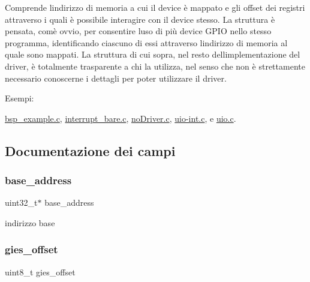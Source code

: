 Comprende l\textquotesingle{}indirizzo di memoria a cui il device è mappato e gli offset dei registri attraverso i quali è possibile interagire con il device stesso. La struttura è pensata, com\textquotesingle{}è ovvio, per consentire l\textquotesingle{}uso di più device G\+P\+IO nello stesso programma, identificando ciascuno di essi attraverso l\textquotesingle{}indirizzo di memoria al quale sono mappati. La struttura di cui sopra, nel resto dell\textquotesingle{}implementazione del driver, è totalmente trasparente a chi la utilizza, nel senso che non è strettamente necessario conoscerne i dettagli per poter utilizzare il driver. \begin{Desc}
\item[Esempi\+: ]\par
\hyperlink{bsp_example_8c-example}{bsp\+\_\+example.\+c}, \hyperlink{interrupt_bare_8c-example}{interrupt\+\_\+bare.\+c}, \hyperlink{no_driver_8c-example}{no\+Driver.\+c}, \hyperlink{uio-int_8c-example}{uio-\/int.\+c}, e \hyperlink{uio_8c-example}{uio.\+c}.\end{Desc}


\subsection{Documentazione dei campi}
\mbox{\label{structmy_g_p_i_o__t_a79c591d5fa42efdf86abd98347fece90}} 
\subsubsection{\texorpdfstring{base\+\_\+address}{base\_address}}
{\footnotesize\ttfamily uint32\+\_\+t$\ast$ base\+\_\+address}

indirizzo base \mbox{\label{structmy_g_p_i_o__t_a396df54cd6cf921c00ea28779db8de42}} 
\subsubsection{\texorpdfstring{gies\+\_\+offset}{gies\_offset}}
{\footnotesize\ttfamily uint8\+\_\+t gies\+\_\+offset}

